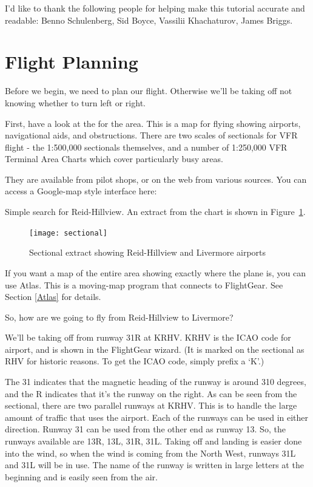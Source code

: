 I'd like to thank the following people for helping make this tutorial accurate
and readable: Benno Schulenberg, Sid Boyce, Vassilii Khachaturov, James Briggs.

\section{Flight Planning}

Before we begin, we need to plan our flight.
Otherwise we'll be taking off not knowing whether to turn left or right.

First, have a look at the  for the area. This is a map for
flying showing airports, navigational aids, and obstructions.
There are two scales of sectionals for VFR flight -
the 1:500,000 sectionals themselves, and a number of
1:250,000 VFR Terminal Area Charts which cover particularly busy areas.

They are available from pilot shops, or on the web from various sources.
You can access a Google-map style interface here:

\medskip
{}
\medskip

Simple search for Reid-Hillview. An extract from the chart is shown in Figure~\ref{sectional}.

\begin{figure}[!htp]
\centering
\texttt{[image: sectional]}
\caption{Sectional extract showing Reid-Hillview and Livermore airports\label{sectional}}
\end{figure}

If you want a map of the entire area showing exactly where the plane is,
you can use Atlas.
This is a moving-map program that connects to FlightGear. See Section \ref{Atlas} for details.

So, how are we going to fly from Reid-Hillview to Livermore?

We'll be taking off from runway 31R at KRHV. KRHV is the ICAO code
for  airport, and is shown in the FlightGear wizard.
(It is marked on the sectional as RHV for historic reasons.
To get the ICAO code, simply prefix a `K'.)

The 31 indicates that the magnetic heading of the runway is around 310 degrees,
and the R indicates that it's the runway on the right. As can be seen from the
sectional, there are two parallel runways at KRHV. This is to handle the large
amount of traffic that uses the airport. Each of the runways can be used in
either direction. Runway 31 can be used from the other end as runway 13.
So, the runways available are 13R, 13L, 31R, 31L. Taking off and landing
is easier done into the wind, so when the wind is coming from the North West,
runways 31L and 31L will be in use. The name of the runway is written in large
letters at the beginning and is easily seen from the air.

